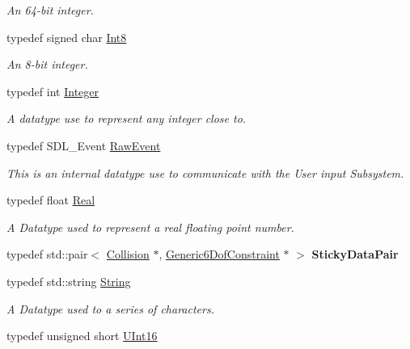 \begin{DoxyCompactItemize}
\begin{DoxyCompactList}\small\item\em An 64-\/bit integer. \item\end{DoxyCompactList}\item 
typedef signed char \hyperlink{namespaceMezzanine_acbb048ee99aa07566d5a6eb33f5a2c2d}{Int8}
\begin{DoxyCompactList}\small\item\em An 8-\/bit integer. \item\end{DoxyCompactList}\item 
typedef int \hyperlink{namespaceMezzanine_ac3576e52af3c62d13dde94829e0c5465}{Integer}
\begin{DoxyCompactList}\small\item\em A datatype use to represent any integer close to. \item\end{DoxyCompactList}\item 
typedef SDL\_\-Event \hyperlink{namespaceMezzanine_ae8d4c0ab783af89a250b0225b75753e5}{RawEvent}
\begin{DoxyCompactList}\small\item\em This is an internal datatype use to communicate with the User input Subsystem. \item\end{DoxyCompactList}\item 
typedef float \hyperlink{namespaceMezzanine_a726731b1a7df72bf3583e4a97282c6f6}{Real}
\begin{DoxyCompactList}\small\item\em A Datatype used to represent a real floating point number. \item\end{DoxyCompactList}\item 
\hypertarget{namespaceMezzanine_a8f75e37c1449f8fb014f20245b78de01}{
typedef std::pair$<$ \hyperlink{classMezzanine_1_1Collision}{Collision} $\ast$, \hyperlink{classMezzanine_1_1Generic6DofConstraint}{Generic6DofConstraint} $\ast$ $>$ {\bfseries StickyDataPair}}
\label{namespaceMezzanine_a8f75e37c1449f8fb014f20245b78de01}

\item 
typedef std::string \hyperlink{namespaceMezzanine_acf9fcc130e6ebf08e3d8491aebcf1c86}{String}
\begin{DoxyCompactList}\small\item\em A Datatype used to a series of characters. \item\end{DoxyCompactList}\item 
\hypertarget{namespaceMezzanine_a1b6c09063432c7ddd87011c88306c767}{
typedef unsigned short \hyperlink{namespaceMezzanine_a1b6c09063432c7ddd87011c88306c767}{UInt16}}
\label{namespaceMezzanine_a1b6c09063432c7ddd87011c88306c767}


\end{DoxyCompactItemize}

